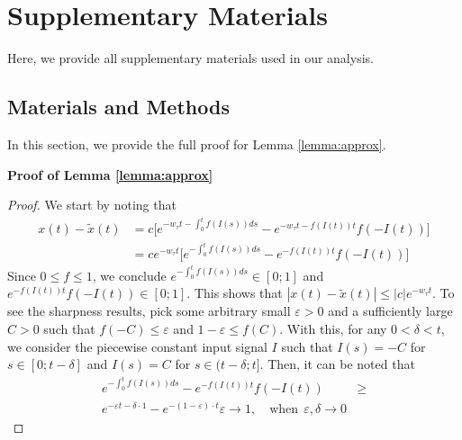 \documentclass[12pt]{article}
\renewcommand{\thetable}{\textbf{\arabic{table}}}
\renewcommand{\thefigure}{\textbf{\arabic{figure}}}
\newcommand{\beginsupplement}{\setcounter{table}{0}
\renewcommand{\thetable}{S\arabic{table}}\setcounter{algorithm}{0}
\renewcommand{\thealgorithm}{S\arabic{algorithm}}\setcounter{equation}{0}
\renewcommand{\theequation}{S\arabic{equation}}\setcounter{figure}{0}
\renewcommand{\thefigure}{S\arabic{figure}}\setcounter{section}{0}
        \renewcommand{\thesection}{S\arabic{section}}}
\begin{document}
\clearpage

\beginsupplement

\section*{Supplementary Materials}
Here, we provide all supplementary materials used in our analysis. 

\subsection*{Materials and Methods}
In this section, we provide the full proof for Lemma \ref{lemma:approx}.

\noindent \textbf{Proof of Lemma \ref{lemma:approx}}
\begin{proof}
We start by noting that
\begin{align*}
x(t) - \tilde{x}(t) & = c \big[ e^{- w_\tau t - \int_0^t f(I(s)) ds } - e^{- w_\tau t - f(I(t)) t }  f(-I(t)) \big] \\
& = c e^{- w_\tau t} \big[ e^{-\int_0^t f(I(s)) ds } - e^{- f(I(t)) t }  f(-I(t)) \big]
\end{align*}
Since $0 \leq f \leq 1$, we conclude $e^{-\int_0^t f(I(s)) ds } \in [0;1]$ and $e^{- f(I(t)) t } f(-I(t)) \in [0;1]$. This shows that $|x(t) - \tilde{x}(t)| \leq |c| e^{- w_\tau t}$. To see the sharpness results, pick some arbitrary small $\varepsilon > 0$ and a sufficiently large $C > 0$ such that $f(-C) \leq \varepsilon$ and $1 - \varepsilon \leq f(C)$. With this, for any $0 < \delta < t$, we consider the piecewise constant input signal $I$ such that $I(s) = -C$ for $s \in [0; t - \delta]$ and $I(s) = C$ for $s \in (t - \delta ; t]$. Then, it can be noted that
\begin{align*}
e^{-\int_0^t f(I(s)) ds } - e^{-f(I(t)) t} f(-I(t)) & \geq \\ 
e^{- \varepsilon t - \delta \cdot 1 } - e^{- (1 - \varepsilon) \cdot t} \varepsilon \to 1 , \quad \text{when} \ \ \varepsilon, \delta \to 0
\end{align*}


\end{proof}
\end{document}
